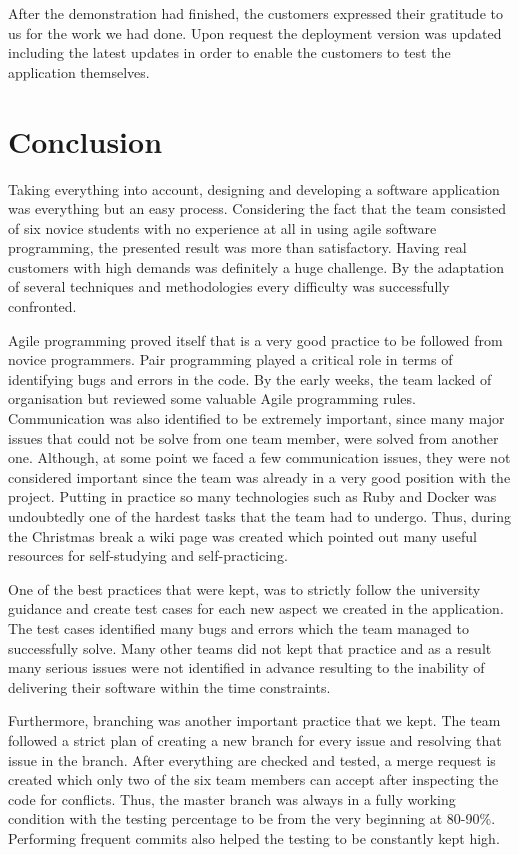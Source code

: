\documentclass{l3proj}
\begin{document}
After the demonstration had finished, the customers expressed their gratitude to us for the work we had done. Upon request the deployment version was updated including the latest updates in order to enable the customers to test the application themselves.

\section{Conclusion}

Taking everything into account, designing and developing a software application was everything but an easy process. Considering the fact that the team consisted of six novice students with no experience at all in using agile software programming, the presented result was more than satisfactory. Having real customers with high demands was definitely a huge challenge. By the adaptation of several techniques and methodologies every difficulty was successfully confronted.

Agile programming proved itself that is a very good practice to be followed from novice programmers. Pair programming played a critical role in terms of identifying bugs and errors in the code. By the early weeks, the team lacked of organisation but reviewed some valuable Agile programming rules. Communication was also identified to be extremely important, since many major issues that could not be solve from one team member, were solved from another one. Although, at some point we faced a few communication issues, they were not considered important since the team was already in a very good position with the project. Putting in practice so many technologies such as Ruby and Docker was undoubtedly one of the hardest tasks that the team had to undergo. Thus, during the Christmas break a wiki page was created which pointed out many useful resources for self-studying and self-practicing.

One of the best practices that were kept, was to strictly follow the university guidance and create test cases for each new aspect we created in the application. The test cases identified many bugs and errors which the team managed to successfully solve. Many other teams did not kept that practice and as a result many serious issues were not identified in advance resulting to the inability of delivering their software within the time constraints.

Furthermore, branching was another important practice that we kept. The team followed a strict plan of creating a new branch for every issue and resolving that issue in the branch. After everything are checked and tested, a merge request is created which only two of the six team members can accept after inspecting the code for conflicts. Thus, the master branch was always in a fully working condition with the testing percentage to be from the very beginning at 80-90\%. Performing frequent commits also helped the testing to be constantly kept high.
\end{document}
